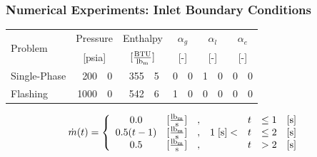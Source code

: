 \documentclass[compress,xcolor=table]{beamer}
\begin{document}
\begin{frame}
\frametitle{Numerical Experiments: Inlet Boundary Conditions}

\begin{table}[ht]
\centering
\begin{tabular}{@{}lr@{.}lr@{.}lr@{.}lr@{.}lr@{.}l@{}} \toprule
\multirow{2}{*}{Problem} & \multicolumn{2}{c}{Pressure} & \multicolumn{2}{c}{Enthalpy}             & \multicolumn{2}{c}{$\alpha_g$} & \multicolumn{2}{c}{$\alpha_l$} & \multicolumn{2}{c}{$\alpha_e$} \\ 
                         & \multicolumn{2}{c}{[psia]} & \multicolumn{2}{c}{$[\frac{\text{BTU}}{\lbm{}}]$} & \multicolumn{2}{c}{[-]}      & \multicolumn{2}{c}{[-]}      & \multicolumn{2}{c}{[-]}      \\ \midrule
Single-Phase &  200&0 & 355&5 & 0&0 & 1&0 & 0&0 \\
Flashing     & 1000&0 & 542&6 & 1&0 & 0&0 & 0&0 \\ \bottomrule  
\end{tabular}
\label{tab:bc_fe}
\end{table}

\begin{equation*}
\label{eqn:bc_time_func_single}
\dot{m}(t) = \left\{
\begin{array}{cclrcll}
 0.0           & [\frac{ \lbm{} }{\text{s}}] & , &                & t & \leq 1 & [\text{s}] \\
 0.5 ( t - 1)  & [\frac{ \lbm{} }{\text{s}}] & , & 1\; [\text{s}] < & t & \leq 2 & [\text{s}] \\
 0.5           & [\frac{ \lbm{} }{\text{s}}] & , &                & t & > 2    & [\text{s}]
\end{array}\right.
\end{equation*}

\end{frame}
\end{document}
